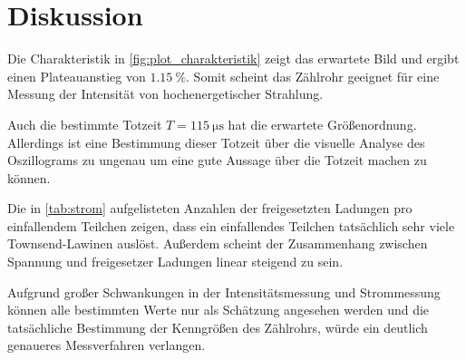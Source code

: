 \section{Diskussion}
\label{sec:Diskussion}

Die Charakteristik in \autoref{fig:plot_charakteristik} zeigt das erwartete Bild und ergibt einen Plateauanstieg von $\SI{1.15}{\percent}$.
Somit scheint das Zählrohr geeignet für eine Messung der Intensität von hochenergetischer Strahlung.

Auch die bestimmte Totzeit $T=\SI{115}{\micro\second}$ hat die erwartete Größenordnung.
Allerdings ist eine Bestimmung dieser Totzeit über die visuelle Analyse des Oszillograms zu ungenau um eine gute Aussage über die Totzeit machen zu können.

Die in \autoref{tab:strom} aufgelisteten Anzahlen der freigesetzten Ladungen pro einfallendem Teilchen zeigen, dass ein einfallendes Teilchen tatsächlich sehr viele Townsend-Lawinen auslöst.
Außerdem scheint der Zusammenhang zwischen Spannung und freigesetzer Ladungen linear steigend zu sein.

Aufgrund großer Schwankungen in der Intensitätsmessung und Strommessung können alle bestimmten Werte nur als Schätzung angesehen werden und die tatsächliche Bestimmung der Kenngrößen des Zählrohrs, würde ein deutlich genaueres Messverfahren verlangen.